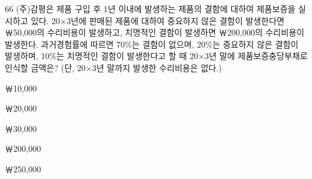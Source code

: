\begin{question}{66}
(주)감평은 제품 구입 후 1년 이내에 발생하는 제품의 결함에 대하여 제품보증을 실시하고 있다. 20×3년에 판매된 제품에 대하여 중요하지 않은 결함이 발생한다면 ￦50,000의 수리비용이 발생하고, 치명적인 결함이 발생하면 ￦200,000의 수리비용이 발생한다. 과거경험률에 따르면 70\%는 결함이 없으며, 20\%는 중요하지 않은 결함이 발생하며, 10\%는 치명적인 결함이 발생한다고 할 때 20×3년 말에 제품보증충당부채로 인식할 금액은? (단, 20×3년 말까지 발생한 수리비용은 없다.)
\begin{choices}
  \item ￦10,000
  \item ￦20,000
  \item ￦30,000
  \item ￦200,000
  \item ￦250,000
\end{choices}
\end{question}
